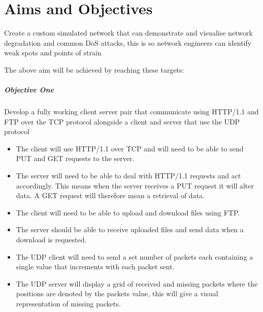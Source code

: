 \chapter{Aims and Objectives}
\begin{center}
Create a custom simulated network that can demonstrate and visualise network degradation and common DoS attacks, this is so network engineers can identify weak spots and points of strain
\end{center}


The above aim will be achieved by reaching these targets:

\paragraph{Objective One}
Develop a fully working client server pair that communicate using HTTP/1.1 \citep{HTTP} and FTP over the TCP protocol alongside a client and server that use the UDP protocol

\begin{itemize}
\item The client will use HTTP/1.1  over TCP and will need to be able to send PUT and GET requests to the server.
\item The server will need to be able to deal with HTTP/1.1 requests and act accordingly. This means when the server receives a PUT request it will alter data. A GET request will therefore mean a retrieval of data. 
\item The client will need to be able to upload and download files using FTP.
\item The server should be able to receive uploaded files and send data when a download is requested.
\item The UDP client will need to send a set number of packets each containing a single value that increments with each packet sent.
\item The UDP server will display a grid of received and missing packets where the positions are denoted by the packets value, this will give a visual representation of missing packets.
\end{itemize}  

